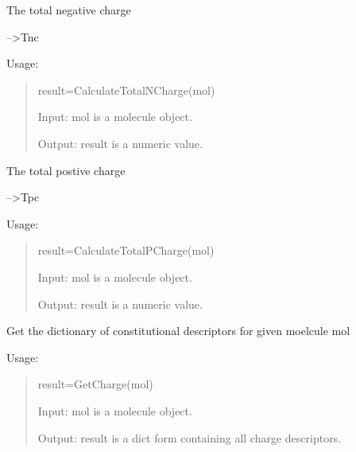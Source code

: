 \documentclass[letterpaper,10pt,english]{sphinxmanual}
\begin{document}

\begin{fulllineitems}
\label{reference/charge:charge.CalculateTotalNCharge}
The total negative charge

--\textgreater{}Tnc

Usage:
\begin{quote}

result=CalculateTotalNCharge(mol)

Input: mol is a molecule object.

Output: result is a numeric value.
\end{quote}

\end{fulllineitems}


\begin{fulllineitems}
\label{reference/charge:charge.CalculateTotalPCharge}
The total postive charge

--\textgreater{}Tpc

Usage:
\begin{quote}

result=CalculateTotalPCharge(mol)

Input: mol is a molecule object.

Output: result is a numeric value.
\end{quote}

\end{fulllineitems}


\begin{fulllineitems}
\label{reference/charge:charge.GetCharge}
Get the dictionary of constitutional descriptors for given moelcule mol

Usage:
\begin{quote}

result=GetCharge(mol)

Input: mol is a molecule object.

Output: result is a dict form containing all charge descriptors.
\end{quote}

\end{fulllineitems}
\end{document}
